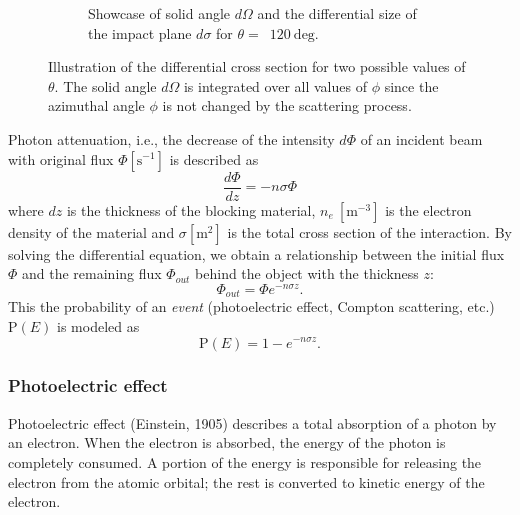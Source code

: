 \documentclass[a4paper,11pt,titlepage,twoside]{article}
\newcommand{\unit}[2]{$#1~\ensuremath{\mathrm{#2}}$}
\begin{document}
\begin{figure}[ht]
\begin{subfigure}{0.49\textwidth}
    \caption{Showcase of solid angle $d\Omega$ and the differential size of the impact plane $d\sigma$ for $\theta=$~\unit{120}{deg}.}
    \label{fig:differential_cross_section_2}
  \end{subfigure}
  \caption{Illustration of the differential cross section for two possible values of $\theta$. The solid angle $d\Omega$ is integrated over all values of $\phi$ since the azimuthal angle $\phi$ is not changed by the scattering process.}
  \label{fig:differential_cross_section}
\end{figure}

Photon attenuation, i.e., the decrease of the intensity $d\Phi$ of an incident beam with original flux $\Phi \left[\mathrm{s}^{-1}\right]$ is described as
\begin{equation}
  \frac{d\Phi}{dz} = -n\sigma\Phi
\end{equation}
where $dz$ is the thickness of the blocking material, \unit{n_e}{\left[m^{-3}\right]} is the electron density of the material and $\sigma \left[\mathrm{m}^{2}\right]$ is the total cross section of the interaction.
By solving the differential equation, we obtain a relationship between the initial flux $\Phi$ and the remaining flux $\Phi_{out}$ behind the object with the thickness $z$:
\begin{equation}
  \Phi_{out} = \Phi e^{-n\sigma z}.
\end{equation}
This the probability of an \emph{event} (photoelectric effect, Compton scattering, etc.) $\mathrm{P}\left(E\right)$ is modeled as
\begin{equation}
  \mathrm{P}\left(E\right) = 1 - e^{-n\sigma z}.
\end{equation}


\subsubsection*{Photoelectric effect}


Photoelectric effect (Einstein, 1905) describes a total absorption of a photon by an electron.
When the electron is absorbed, the energy of the photon is completely consumed.
A portion of the energy is responsible for releasing the electron from the atomic orbital; the rest is converted to kinetic energy of the electron.
\end{document}
